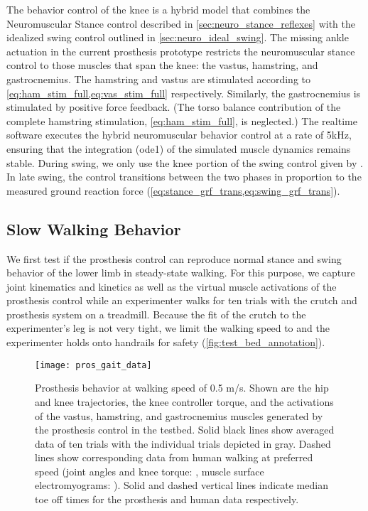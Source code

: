 The behavior control of the knee is a hybrid model that combines the
Neuromuscular Stance control described in \cref{sec:neuro_stance_reflexes} with
the idealized swing control outlined in \cref{sec:neuro_ideal_swing}. The
missing ankle actuation in the current prosthesis prototype restricts the
neuromuscular stance control to those muscles that span the knee: the vastus,
hamstring, and gastrocnemius. The hamstring and vastus are stimulated according
to \cref{eq:ham_stim_full,eq:vas_stim_full} respectively.  Similarly, the
gastrocnemius is stimulated by positive force feedback. (The torso balance
contribution of the complete hamstring stimulation, \cref{eq:ham_stim_full}, is
neglected.) The realtime software executes the hybrid neuromuscular behavior
control at a rate of 5kHz, ensuring that the integration (ode1) of the simulated
muscle dynamics remains stable. During swing, we only use the knee portion of
the swing control given by . In late swing,
the control transitions between the two phases in proportion to the measured
ground reaction force (\cref{eq:stance_grf_trans,eq:swing_grf_trans}).

\subsection{Slow Walking Behavior}\label{sec:completed_knee_exp_walk}
We first test if the prosthesis control can reproduce normal stance and swing
behavior of the lower limb in steady-state walking. For this purpose, we capture
joint kinematics and kinetics as well as the virtual muscle activations of the
prosthesis control while an experimenter walks for ten trials with the crutch
and prosthesis system on a treadmill. Because the fit of the crutch to the
experimenter's leg is not very tight, we limit the walking speed to
 and the experimenter holds onto handrails for safety
(\cref{fig:test_bed_annotation}).
\begin{figure}[t]
    \centering
    \texttt{[image: pros\_gait\_data]}
    \caption{Prosthesis behavior at walking speed of 0.5 m/s. Shown are the hip
    and knee trajectories, the knee controller torque, and the activations of
    the vastus, hamstring, and gastrocnemius muscles generated by the
    prosthesis control in the testbed. Solid black lines show averaged data  of
    ten trials with the individual trials depicted in gray. Dashed lines show
    corresponding data from human walking at preferred speed (joint angles and
    knee torque: \citet{winter2009biomechanics}, muscle surface
    electromyograms: \citet{perry2010gait}). Solid and dashed vertical lines
    indicate median toe off times for the prosthesis and human data
    respectively.
    }\label{fig:pros_gait_data}
\end{figure}

